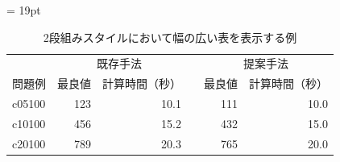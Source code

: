 \begin{table}
 \centering
 \tabcolsep = 19pt
 \renewcommand{\arraystretch}{0.8}
 \caption{2段組みスタイルにおいて幅の広い表を表示する例}
 \label{table2}
 \begin{tabular}{lrrcrr} \hline
  &\multicolumn{2}{c}{既存手法} && \multicolumn{2}{c}{提案手法}\\ \cline{2-3} \cline{5-6}

  問題例 & 最良値 & 計算時間（秒）&& 最良値 & 計算時間（秒） \\ \hline
  c05100 &    123 &          10.1 &&    111 &          10.0 \\
  c10100 &    456 &          15.2 &&    432 &          15.0 \\
  c20100 &    789 &          20.3 &&    765 &          20.0 \\ \hline
 \end{tabular}
\end{table}
